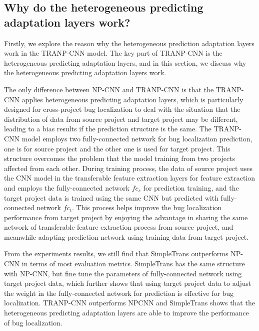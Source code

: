 \subsection{Why do the heterogeneous predicting adaptation layers work? }
Firstly, we explore the reason why the heterogeneous prediction adaptation layers work in the TRANP-CNN model. The key part of TRANP-CNN is the heterogeneous predicting adaptation layers, and in this section, we discuss why the heterogeneous predicting adaptation layers work. 

The only difference between NP-CNN and TRANP-CNN is that the TRANP-CNN applies heterogeneous predicting adaptation layers, which is particularly designed for cross-project bug localization to deal with the situation that the distribution of data from source project and target project may be different, leading to a bias results if the prediction structure is the same. The TRANP-CNN model employs two fully-connected network for bug localization prediction, one is for source project and the other one is used for target project. This structure overcomes the problem that the model training from two projects affected from each other. During training process, the data of source project uses the CNN model in the transferable feature extraction layers  for feature extraction and employs the fully-connected network $fc_s$ for prediction training, and the target project data is trained using the same CNN but predicted with fully-connected network $fc_t$. This process helps improve the bug localization performance from target project by enjoying the advantage in sharing the same network of transferable feature extraction process from source project, and meanwhile adapting prediction network using training data from target project. 

From the experiments results, we still find that SimpleTrans outperforms NP-CNN in terms of most evaluation metrics. SimpleTrans has the same structure with NP-CNN, but fine tune the parameters of fully-connected network using target project data, which further shows that using target project data to adjust the weight in the fully-connected network for prediction is effective for bug localization. TRANP-CNN outperforms NPCNN and SimpleTrans shows that the heterogeneous predicting adaptation layers are able to improve the performance of bug localization. 

